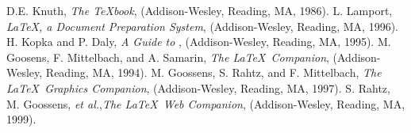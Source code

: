 \documentclass[%
 ,twocolumn%
 ,secnumarabic%
,amssymb, amsmath,nobibnotes, aps, prl]{revtex4}
\begin{document}
\begin{thebibliography}{}\label{sec:TeXbooks}
 D.E. Knuth, \emph{The \TeX book},
(Addison-Wesley, Reading, MA, 1986).
 L. Lamport, \emph{\LaTeX, a Document
Preparation System}, (Addison-Wesley, Reading, MA, 1996).
 H. Kopka and P. Daly, \emph{A Guide to
\LaTeXe}, (Addison-Wesley, Reading, MA, 1995).
 M. Goosens, F. Mittelbach, and
A. Samarin, \emph{The \LaTeX\
Companion}, (Addison-Wesley, Reading, MA, 1994).
 M. Goossens, S. Rahtz, and
F. Mittelbach, \emph{The
\LaTeX\ Graphics Companion}, (Addison-Wesley, Reading, MA, 1997).
\bibitem[Rahtz(1999)]{CompanW} S. Rahtz, M. Goossens, \emph{et
al.},\emph{The \LaTeX\ Web Companion}, (Addison-Wesley, Reading, MA, 1999).
\end{thebibliography}
\end{document}
